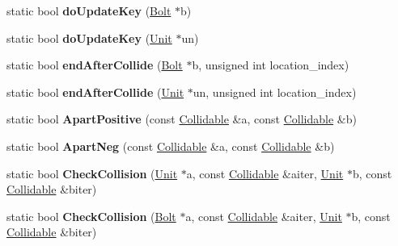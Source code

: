 \begin{DoxyCompactItemize}
\item 
static bool {\bfseries do\+Update\+Key} (\hyperlink{classBolt}{Bolt} $\ast$b)\hypertarget{classCollideChecker_a1915889ffc76fd4dfd1e197d6a11532f}{}\label{classCollideChecker_a1915889ffc76fd4dfd1e197d6a11532f}

\item 
static bool {\bfseries do\+Update\+Key} (\hyperlink{classUnit}{Unit} $\ast$un)\hypertarget{classCollideChecker_a6a7ab509f0b19f48e8b5a0139f55a2fb}{}\label{classCollideChecker_a6a7ab509f0b19f48e8b5a0139f55a2fb}

\item 
static bool {\bfseries end\+After\+Collide} (\hyperlink{classBolt}{Bolt} $\ast$b, unsigned int location\+\_\+index)\hypertarget{classCollideChecker_a0eb3e444072653fe9b7c43758cf91edc}{}\label{classCollideChecker_a0eb3e444072653fe9b7c43758cf91edc}

\item 
static bool {\bfseries end\+After\+Collide} (\hyperlink{classUnit}{Unit} $\ast$un, unsigned int location\+\_\+index)\hypertarget{classCollideChecker_ab99b936c85da5b0c839271a7ade7849d}{}\label{classCollideChecker_ab99b936c85da5b0c839271a7ade7849d}

\item 
static bool {\bfseries Apart\+Positive} (const \hyperlink{classCollidable}{Collidable} \&a, const \hyperlink{classCollidable}{Collidable} \&b)\hypertarget{classCollideChecker_a17572cea4deeac0b417e393896554b04}{}\label{classCollideChecker_a17572cea4deeac0b417e393896554b04}

\item 
static bool {\bfseries Apart\+Neg} (const \hyperlink{classCollidable}{Collidable} \&a, const \hyperlink{classCollidable}{Collidable} \&b)\hypertarget{classCollideChecker_a2fe068e2fcbdbc853a7439a137a2959c}{}\label{classCollideChecker_a2fe068e2fcbdbc853a7439a137a2959c}

\item 
static bool {\bfseries Check\+Collision} (\hyperlink{classUnit}{Unit} $\ast$a, const \hyperlink{classCollidable}{Collidable} \&aiter, \hyperlink{classUnit}{Unit} $\ast$b, const \hyperlink{classCollidable}{Collidable} \&biter)\hypertarget{classCollideChecker_ad918c6b0c761457dda2e74b44e1b79df}{}\label{classCollideChecker_ad918c6b0c761457dda2e74b44e1b79df}

\item 
static bool {\bfseries Check\+Collision} (\hyperlink{classBolt}{Bolt} $\ast$a, const \hyperlink{classCollidable}{Collidable} \&aiter, \hyperlink{classUnit}{Unit} $\ast$b, const \hyperlink{classCollidable}{Collidable} \&biter)\hypertarget{classCollideChecker_adb1c3d27e97c9b29561558e581455da5}{}\label{classCollideChecker_adb1c3d27e97c9b29561558e581455da5}


\end{DoxyCompactItemize}
